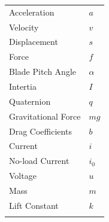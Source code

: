 \documentclass{article}
\begin{document}
\begin{center}
\begin{tabular}{l|l}
Acceleration & $a$ \\
Velocity & $v$ \\\rowcolor{gainsboro}
Displacement & $s$ \\
Force & $f$ \\\rowcolor{gainsboro}
Blade Pitch Angle & $\alpha$ \\
Intertia & $I$  \\\rowcolor{gainsboro}
Quaternion & $q$ \\
Gravitational Force & $mg$ \\\rowcolor{gainsboro}
Drag Coefficients & $b$  \\
Current & $i$ \\\rowcolor{gainsboro}
No-load Current & $i_0$ \\
Voltage & $u$ \\\rowcolor{gainsboro}
Mass & $m$ \\
Lift Constant & $k$\\\rowcolor{gainsboro}
\end{tabular}                                                     \end{center}
\newpage


\tableofcontents
\listoffigures
\listoftables
\newpage


\newpage


\newpage


\newpage


\newpage


\newpage





\end{document}
